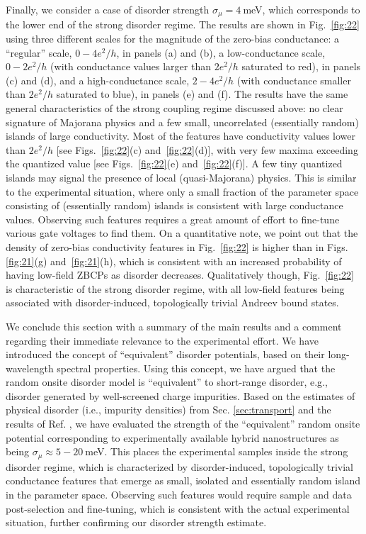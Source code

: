 \documentclass[aps,prmaterials,twocolumn,superscriptaddress,longbibliography]{revtex4-2}
\begin{document}
Finally, we consider a case of disorder strength $\sigma_\mu=4~$meV, which corresponds to the lower end of the strong disorder regime. The results are shown in Fig.~\ref{fig:22} using three different scales for the magnitude of the zero-bias conductance: a ``regular'' scale, $ 0 - 4e^2/h$, in panels (a) and (b), a low-conductance scale, $ 0 - 2e^2/h$ (with conductance values larger than $2e^2/h$ saturated to red),  in panels (c) and (d), and a high-conductance scale,  $2 - 4 e^2/h$ (with conductance smaller than $2e^2/h$ saturated to blue), in panels (e) and (f). The results have the same general characteristics of the strong coupling regime discussed above: no clear signature of Majorana physics and a few small, uncorrelated (essentially random) islands of large conductivity. Most of the features have conductivity values lower than $2e^2/h$ [see Figs.~\ref{fig:22}(c) and~\ref{fig:22}(d)], with very few maxima exceeding the quantized value [see Figs.~\ref{fig:22}(e) and~\ref{fig:22}(f)]. A few tiny quantized islands may signal the presence of local (quasi-Majorana) physics. This is similar to the experimental situation, where only a small fraction of the parameter space consisting of (essentially random) islands is consistent with large conductance values. Observing such features requires a great amount of effort to fine-tune various gate voltages to find them. On a quantitative note, we point out that the density of zero-bias conductivity features in Fig.~\ref{fig:22} is higher than in Figs.  \ref{fig:21}(g) and~\ref{fig:21}(h), which is consistent with an increased probability of having low-field ZBCPs as disorder decreases. Qualitatively though,  Fig.~\ref{fig:22} is characteristic of the strong disorder regime, with all low-field features being associated with disorder-induced, topologically trivial Andreev bound states. 

We conclude this section with a summary of the main results and a comment regarding their immediate relevance to the experimental effort. We have introduced the concept of ``equivalent'' disorder potentials, based on their long-wavelength spectral properties. Using this concept, we have argued that the random onsite disorder model is ``equivalent'' to short-range disorder, e.g., disorder generated by well-screened charge impurities. Based on the estimates of physical disorder (i.e., impurity densities) from Sec. \ref{sec:transport} and the results of Ref.  , we have evaluated the strength of the ``equivalent'' random onsite potential corresponding to experimentally available hybrid nanostructures as being $\sigma_\mu \approx 5-20~$meV. This places the experimental samples inside the strong disorder regime, which is characterized by disorder-induced, topologically trivial conductance features that emerge as small, isolated and essentially random island in the parameter space. Observing such features would require sample and data post-selection and fine-tuning, which is consistent with the actual experimental situation, further confirming our disorder strength estimate. 
\end{document}
